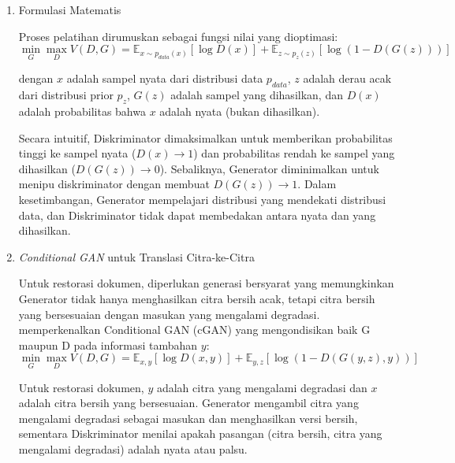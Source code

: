 \begin{enumerate}[leftmargin=*, labelindent=0pt, itemsep=1ex, topsep=0pt]

\item Formulasi Matematis
\label{para:gan-formulasi}

Proses pelatihan dirumuskan sebagai fungsi nilai yang dioptimasi:
\begin{equation}
      \min_G \max_D V(D, G) = \mathbb{E}_{x \sim p_{data}(x)}[\log D(x)] + \mathbb{E}_{z \sim p_z(z)}[\log(1 - D(G(z)))]
\end{equation}

dengan $x$ adalah sampel nyata dari distribusi data $p_{data}$, $z$ adalah derau acak dari distribusi prior $p_z$, $G(z)$ adalah sampel yang dihasilkan, dan $D(x)$ adalah probabilitas bahwa $x$ adalah nyata (bukan dihasilkan).

Secara intuitif, Diskriminator dimaksimalkan untuk memberikan probabilitas tinggi ke sampel nyata ($D(x) \to 1$) dan probabilitas rendah ke sampel yang dihasilkan ($D(G(z)) \to 0$). Sebaliknya, Generator diminimalkan untuk menipu diskriminator dengan membuat $D(G(z)) \to 1$. Dalam kesetimbangan, Generator mempelajari distribusi yang mendekati distribusi data, dan Diskriminator tidak dapat membedakan antara nyata dan yang dihasilkan.

\item \textit{Conditional GAN} untuk Translasi Citra-ke-Citra
\label{para:conditional-gan}

Untuk restorasi dokumen, diperlukan generasi bersyarat yang memungkinkan Generator tidak hanya menghasilkan citra bersih acak, tetapi citra bersih yang bersesuaian dengan masukan yang mengalami degradasi. \parencite{mirza2014} memperkenalkan Conditional GAN (cGAN) yang mengondisikan baik G maupun D pada informasi tambahan $y$:
\begin{equation}
      \min_G \max_D V(D, G) = \mathbb{E}_{x, y}[\log D(x, y)] + \mathbb{E}_{y, z}[\log(1 - D(G(y, z), y))]
\end{equation}

Untuk restorasi dokumen, $y$ adalah citra yang mengalami degradasi dan $x$ adalah citra bersih yang bersesuaian. Generator mengambil citra yang mengalami degradasi sebagai masukan dan menghasilkan versi bersih, sementara Diskriminator menilai apakah pasangan (citra bersih, citra yang mengalami degradasi) adalah nyata atau palsu.

\end{enumerate}

